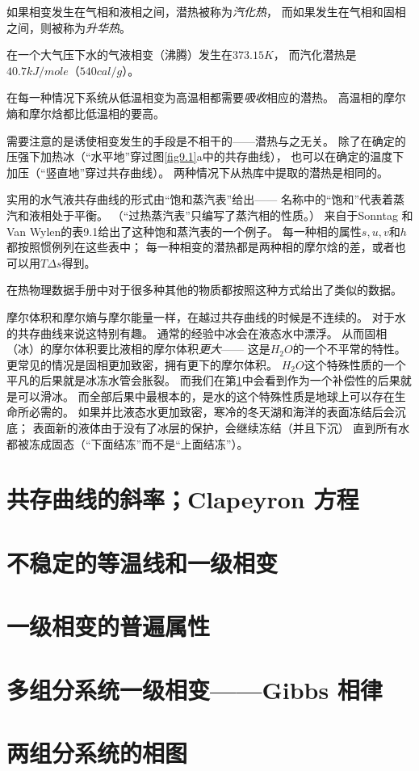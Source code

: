 如果相变发生在气相和液相之间，潜热被称为{\it 汽化热}，
而如果发生在气相和固相之间，则被称为{\it 升华热}。

在一个大气压下水的气液相变（沸腾）发生在$373.15K$，
而汽化潜热是$40.7kJ/mole$（$540cal/g$）。

在每一种情况下系统从低温相变为高温相都需要{\it 吸收}相应的潜热。
高温相的摩尔熵和摩尔焓都比低温相的要高。

需要注意的是诱使相变发生的手段是不相干的——潜热与之无关。
除了在确定的压强下加热冰（“水平地”穿过图\ref{fig9.1}a中的共存曲线），
也可以在确定的温度下加压（“竖直地”穿过共存曲线）。
两种情况下从热库中提取的潜热是相同的。

实用的水气液共存曲线的形式由“饱和蒸汽表”给出——
名称中的“饱和”代表着蒸汽和液相处于平衡。
（“过热蒸汽表”只编写了蒸汽相的性质。）
来自于Sonntag 和Van Wylen的表9.1给出了这种饱和蒸汽表的一个例子。
每一种相的属性$s,u,v$和$h$都按照惯例列在这些表中；
每一种相变的潜热都是两种相的摩尔焓的差，或者也可以用$T\Delta s$得到。

在热物理数据手册中对于很多种其他的物质都按照这种方式给出了类似的数据。

摩尔体积和摩尔熵与摩尔能量一样，在越过共存曲线的时候是不连续的。
对于水的共存曲线来说这特别有趣。
通常的经验中冰会在液态水中漂浮。
从而固相（冰）的摩尔体积要比液相的摩尔体积{\it 更大}——
这是$H_2O$的一个不平常的特性。
更常见的情况是固相更加致密，拥有更下的摩尔体积。
$H_2O$这个特殊性质的一个平凡的后果就是冰冻水管会胀裂。
而我们在第\ref{sec9.3}中会看到作为一个补偿性的后果就是可以滑冰。
而全部后果中最根本的，是水的这个特殊性质是地球上可以存在生命所必需的。
如果并比液态水更加致密，寒冷的冬天湖和海洋的表面冻结后会沉底；
表面新的液体由于没有了冰层的保护，会继续冻结（并且下沉）
直到所有水都被冻成固态（“下面结冻”而不是“上面结冻”）。

\section{共存曲线的斜率；Clapeyron 方程}
\label{sec9.3}



\section{不稳定的等温线和一级相变}
\label{sec9.4}


\section{一级相变的普遍属性}
\label{sec9.5}

\section{多组分系统一级相变——Gibbs 相律}
\label{sec9.6}

\section{两组分系统的相图}
\label{sec9.7}